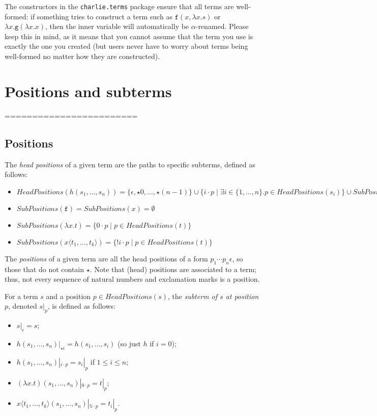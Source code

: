 \documentclass{lmcs}
\theoremstyle{theorem}\newtheorem{theorem}{Theorem}
\theoremstyle{theorem}\newtheorem{lemma}[theorem]{Lemma}
\theoremstyle{theorem}\newtheorem{corollary}[theorem]{Corollary}
\theoremstyle{definition}\newtheorem{definition}[theorem]{Definition}
\theoremstyle{definition}\newtheorem{example}[theorem]{Example}
\newcommand{\SubPositions}{\mathit{SubPositions}}
\newcommand{\HeadPositions}{\mathit{HeadPositions}}
\newcommand{\identifier}[1]{\mathtt{#1}}
\newcommand{\afun}{\identifier{f}}
\newcommand{\bfun}{\identifier{g}}
\newcommand{\avar}{x}
\newcommand{\abs}[2]{\lambda #1.#2}
\newcommand{\meta}[2]{#1\langle#2\rangle}
\begin{document}
The constructors in the \texttt{charlie.terms} package ensure that all terms
are well-formed: if something tries to construct a term such as $\afun(\avar,
\abs{\avar}{s})$ or $\abs{\avar}{\bfun(\abs{\avar}{\avar})}$, then the inner
variable will automatically be $\alpha$-renamed.  Please keep this in mind, as
it means that you cannot assume that the term you use is exactly the one you
created (but users never have to worry about terms being well-formed no matter
how they are constructed).

\section{Positions and subterms}

========================

\subsection{Positions}

The \emph{head positions} of a given term are the paths to specific subterms,
defined as follows:

\begin{itemize}
\item $\HeadPositions(h(s_1,\dots,s_n)) = \{ \epsilon, \star 0, \dots, \star (n-1) \} \cup
  \{ i \cdot p \mid \exists i \in \{1,\dots,n\}. p \in \HeadPositions(s_i) \} \cup
  \SubPositions(h)$
\item $\SubPositions(\afun) = \SubPositions(\avar) = \emptyset$
\item $\SubPositions(\abs{\avar}{t}) = \{ 0 \cdot p \mid p \in \HeadPositions(t) \}$
\item $\SubPositions(\meta{\avar}{t_1,\dots,t_k}) = \{ !i \cdot p \mid p \in
  \HeadPositions(t) \}$
\end{itemize}

The \emph{positions} of a given term are all the head positions of a form $p_1 \cdots p_n \epsilon$,
so those that do not contain $\star$.
Note that (head) positions are associated to a term; thus, not every sequence of natural numbers
and exclamation marks is a position.

For a term $s$ and a position $p \in \HeadPositions(s)$, the \emph{subterm of $s$ at position $p$},
denoted $s|_p$, is defined as follows:
\begin{itemize}
\item $s|_\epsilon = s$;
\item $h(s_1,\dots,s_n)|_{\star i} = h(s_1,\dots,s_i)$ (so just $h$ if $i = 0$);
\item $h(s_1,\dots,s_n)|_{i \cdot p} = s_i|_p$ if $1 \leq i \leq n$;
\item $(\abs{\avar}{t})(s_1,\dots,s_n)|_{0 \cdot p} = t|_p$;
\item $\meta{\avar}{t_1,\dots,t_k}(s_1,\dots,s_n)|_{!i \cdot p} = t_i|_p$.
\end{itemize}
\end{document}
